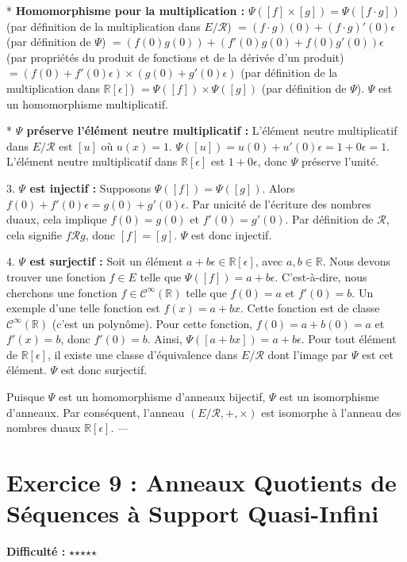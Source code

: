 \documentclass{report}
\begin{document}
    *   \textbf{Homomorphisme pour la multiplication :}
        $\Psi([f] \times [g]) = \Psi([f \cdot g])$ (par définition de la multiplication dans $E/\mathcal{R}$)
        $= (f \cdot g)(0) + (f \cdot g)'(0)\epsilon$ (par définition de $\Psi$)
        $= (f(0)g(0)) + (f'(0)g(0) + f(0)g'(0))\epsilon$ (par propriétés du produit de fonctions et de la dérivée d'un produit)
        $= (f(0) + f'(0)\epsilon) \times (g(0) + g'(0)\epsilon)$ (par définition de la multiplication dans $\mathbb{R}[\epsilon]$)
        $= \Psi([f]) \times \Psi([g])$ (par définition de $\Psi$).
        $\Psi$ est un homomorphisme multiplicatif.

    *   \textbf{$\Psi$ préserve l'élément neutre multiplicatif :}
        L'élément neutre multiplicatif dans $E/\mathcal{R}$ est $[u]$ où $u(x)=1$.
        $\Psi([u]) = u(0) + u'(0)\epsilon = 1 + 0\epsilon = 1$.
        L'élément neutre multiplicatif dans $\mathbb{R}[\epsilon]$ est $1 + 0\epsilon$, donc $\Psi$ préserve l'unité.

3.  \textbf{$\Psi$ est injectif :}
    Supposons $\Psi([f]) = \Psi([g])$.
    Alors $f(0) + f'(0)\epsilon = g(0) + g'(0)\epsilon$.
    Par unicité de l'écriture des nombres duaux, cela implique $f(0) = g(0)$ et $f'(0) = g'(0)$.
    Par définition de $\mathcal{R}$, cela signifie $f \mathcal{R} g$, donc $[f] = [g]$.
    $\Psi$ est donc injectif.

4.  \textbf{$\Psi$ est surjectif :}
    Soit un élément $a + b\epsilon \in \mathbb{R}[\epsilon]$, avec $a, b \in \mathbb{R}$.
    Nous devons trouver une fonction $f \in E$ telle que $\Psi([f]) = a + b\epsilon$.
    C'est-à-dire, nous cherchons une fonction $f \in \mathcal{C}^\infty(\mathbb{R})$ telle que $f(0) = a$ et $f'(0) = b$.
    Un exemple d'une telle fonction est $f(x) = a + bx$.
    Cette fonction est de classe $\mathcal{C}^\infty(\mathbb{R})$ (c'est un polynôme).
    Pour cette fonction, $f(0) = a + b(0) = a$ et $f'(x) = b$, donc $f'(0) = b$.
    Ainsi, $\Psi([a+bx]) = a + b\epsilon$.
    Pour tout élément de $\mathbb{R}[\epsilon]$, il existe une classe d'équivalence dans $E/\mathcal{R}$ dont l'image par $\Psi$ est cet élément.
    $\Psi$ est donc surjectif.

Puisque $\Psi$ est un homomorphisme d'anneaux bijectif, $\Psi$ est un isomorphisme d'anneaux.
Par conséquent, l'anneau $(E/\mathcal{R}, +, \times)$ est isomorphe à l'anneau des nombres duaux $\mathbb{R}[\epsilon]$.
\newpage
---

\chapter*{Exercice 9 : Anneaux Quotients de Séquences à Support Quasi-Infini}
\textbf{Difficulté :} $\star$$\star$$\star$$\star$$\star$
\end{document}
